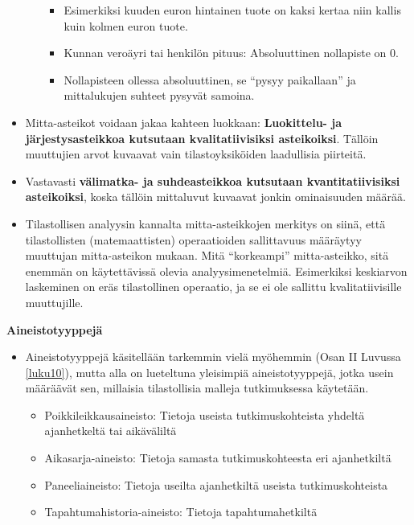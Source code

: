 \documentclass[
]{book}
\providecommand{\tightlist}{%
  \setlength{\itemsep}{0pt}\setlength{\parskip}{0pt}}
\begin{document}
\begin{itemize}
\begin{itemize}
    \begin{itemize}
    \tightlist
    \item
      Esimerkiksi kuuden euron hintainen tuote on kaksi kertaa niin kallis kuin kolmen euron tuote.
    \item
      Kunnan veroäyri tai henkilön pituus: Absoluuttinen nollapiste on 0.
    \item
      Nollapisteen ollessa absoluuttinen, se ``pysyy paikallaan'' ja mittalukujen suhteet pysyvät samoina.
    \end{itemize}
  \end{itemize}
\item
  Mitta-asteikot voidaan jakaa kahteen luokkaan: \textbf{Luokittelu- ja järjestysasteikkoa kutsutaan kvalitatiivisiksi asteikoiksi}. Tällöin muuttujien arvot kuvaavat vain tilastoyksiköiden laadullisia piirteitä.
\item
  Vastavasti \textbf{välimatka- ja suhdeasteikkoa kutsutaan kvantitatiivisiksi asteikoiksi}, koska tällöin mittaluvut kuvaavat jonkin ominaisuuden määrää.
\item
  Tilastollisen analyysin kannalta mitta-asteikkojen merkitys on siinä, että tilastollisten (matemaattisten) operaatioiden sallittavuus määräytyy muuttujan mitta-asteikon mukaan. Mitä ``korkeampi'' mitta-asteikko, sitä enemmän on käytettävissä olevia analyysimenetelmiä. Esimerkiksi keskiarvon laskeminen on eräs tilastollinen operaatio, ja se ei ole sallittu kvalitatiivisille muuttujille.
\end{itemize}

\hfill\break
\textbf{Aineistotyyppejä}

\begin{itemize}
\tightlist
\item
  Aineistotyyppejä käsitellään tarkemmin vielä myöhemmin (Osan II Luvussa \ref{luku10}), mutta alla on lueteltuna yleisimpiä aineistotyyppejä, jotka usein määräävät sen, millaisia tilastollisia malleja tutkimuksessa käytetään.

  \begin{itemize}
  \tightlist
  \item
    Poikkileikkausaineisto: Tietoja useista tutkimuskohteista yhdeltä ajanhetkeltä tai aikäväliltä
  \item
    Aikasarja-aineisto: Tietoja samasta tutkimuskohteesta eri ajanhetkiltä
  \item
    Paneeliaineisto: Tietoja useilta ajanhetkiltä useista tutkimuskohteista
  \item
    Tapahtumahistoria-aineisto: Tietoja tapahtumahetkiltä
  \end{itemize}
\end{itemize}
\end{document}
